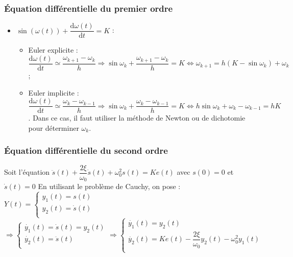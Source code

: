 \subsubsection{Équation différentielle du premier ordre}

\begin{itemize}[label=,font=\color{red}] 
\item  $\sin \left(\omega(t)\right) + \dfrac{\text{d}\omega(t)}{\text{d}t}=K$ :
\begin{itemize}
\item Euler explicite : $\dfrac{\text{d} \omega(t)}{\text{d}t}\simeq \dfrac{\omega_{k+1}-\omega_k}{h} \Rightarrow  \sin \omega_k +  \dfrac{\omega_{k+1}-\omega_k}{h}=K \Leftrightarrow  \omega_{k+1}=h\left( K - \sin \omega_k\right)+\omega_k$;
\item Euler implicite : $\dfrac{\text{d} \omega(t)}{\text{d}t}\simeq \dfrac{\omega_{k}-\omega_{k-1}}{h} \Rightarrow \sin \omega_k +  \dfrac{\omega_{k}-\omega_{k-1}}{h}=K \Leftrightarrow h\sin \omega_k +  \omega_{k}-\omega_{k-1}=hK$. Dans ce cas, il faut utiliser la méthode de Newton ou de dichotomie pour déterminer $\omega_k$.
\end{itemize}

\end{itemize}


\subsubsection{Équation différentielle du second ordre}

 Soit l'équation $\ddot{s}(t) + \dfrac{2\xi}{\omega_0} \dot{s}(t) + \omega_0^2 s(t) = Ke(t)$ avec $s(0)=0$ et $\dot{s}(t)=0$
En utilisant le problème de Cauchy, on pose : 
$Y(t)=
\left\{
\begin{array}{l}
y_1(t) = s(t) \\
y_2(t) = \dot{s}(t) \\
\end{array}
\right.$
$\Rightarrow 
\left\{
\begin{array}{l}
\dot{y_1}(t) = \dot{s}(t) = y_2(t) \\
\dot{y_2}(t) = \ddot{s}(t) \\
\end{array}
\right.
\Rightarrow 
\left\{
\begin{array}{l}
\dot{y_1}(t) = y_2(t) \\
\dot{y_2}(t) =  Ke(t) - \dfrac{2\xi}{\omega_0} y_2(t)- \omega_0^2 y_1(t) \\
\end{array}
\right.
$

